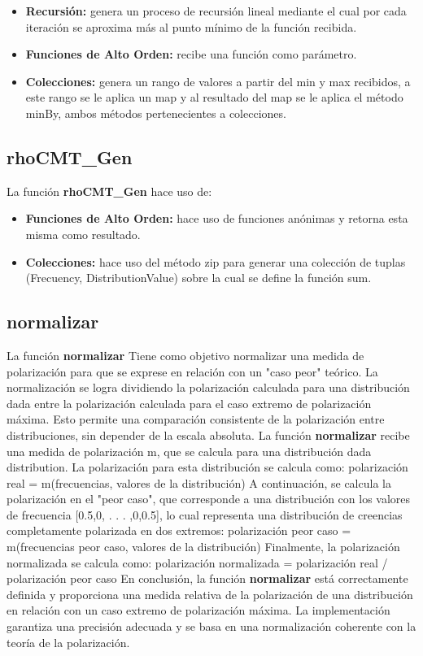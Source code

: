 \documentclass{article}
\begin{document}
    \begin{itemize}
      \item \textbf{Recursión:} genera un proceso de recursión lineal mediante el cual por cada iteración se aproxima más al punto mínimo de la función recibida.
      \item \textbf{Funciones de Alto Orden:} recibe una función como parámetro.
      \item \textbf{Colecciones:} genera un rango de valores a partir del min y max recibidos, a este rango se le aplica un map y al resultado del map se le aplica el método minBy, ambos métodos pertenecientes a colecciones.
    \end{itemize}

    \subsection{rhoCMT\_Gen}
    La función \textbf{rhoCMT\_Gen} hace uso de:

    \begin{itemize}
      \item \textbf{Funciones de Alto Orden:} hace uso de funciones anónimas y retorna esta misma como resultado.
      \item \textbf{Colecciones:} hace uso del método zip para generar una colección de tuplas (Frecuency, DistributionValue) sobre la cual se define la función sum.
    \end{itemize}

    \subsection{normalizar}
    La función \textbf{normalizar} Tiene como objetivo normalizar una medida de polarización para que se exprese en relación con un "caso peor" teórico. La normalización se logra dividiendo la polarización calculada para una distribución dada entre la polarización calculada para el caso extremo de polarización máxima. Esto permite una comparación consistente de la polarización entre distribuciones, sin depender de la escala absoluta.
    La función \textbf{normalizar} recibe una medida de polarización m, que se calcula para una distribución dada distribution. La polarización para esta distribución se calcula como: polarización real = m(frecuencias, valores de la distribución)
    A continuación, se calcula la polarización en el "peor caso", que corresponde a una distribución con los valores de frecuencia [0.5,0, . . . ,0,0.5], lo cual representa una distribución de creencias completamente polarizada en dos extremos: polarización peor caso = m(frecuencias peor caso, valores de la distribución)
    Finalmente, la polarización normalizada se calcula como: polarización normalizada = polarización real / polarización peor caso
    En conclusión, la función \textbf{normalizar} está correctamente definida y proporciona una medida relativa de la polarización de una distribución en relación con un caso extremo de polarización máxima. La implementación garantiza una precisión adecuada y se basa en una normalización coherente con la teoría de la polarización.
\end{document}
